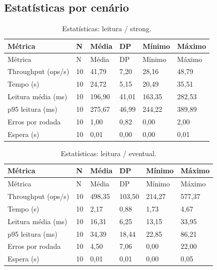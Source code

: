 \subsection{Estatísticas por cenário}
\begingroup\small\setlength{\tabcolsep}{4pt}
\begin{longtable}{llllll}
\caption{Estatísticas: leitura / strong.}\\
\toprule
Métrica & N & Média & DP & Mínimo & Máximo\\\midrule\endfirsthead
\toprule
Métrica & N & Média & DP & Mínimo & Máximo\\\midrule\endhead
\bottomrule\endfoot
Throughput (ops/s) & 10 & 41,79 & 7,20 & 28,16 & 48,79\\
Tempo (s) & 10 & 24,72 & 5,15 & 20,49 & 35,51\\
Leitura média (ms) & 10 & 196,90 & 41,01 & 163,35 & 282,53\\
p95 leitura (ms) & 10 & 275,67 & 46,99 & 244,22 & 389,89\\
Erros por rodada & 10 & 1,00 & 0,82 & 0,00 & 2,00\\
Espera (s) & 10 & 0,01 & 0,00 & 0,00 & 0,01\\
\end{longtable}
\endgroup

\begingroup\small\setlength{\tabcolsep}{4pt}
\begin{longtable}{llllll}
\caption{Estatísticas: leitura / eventual.}\\
\toprule
Métrica & N & Média & DP & Mínimo & Máximo\\\midrule\endfirsthead
\toprule
Métrica & N & Média & DP & Mínimo & Máximo\\\midrule\endhead
\bottomrule\endfoot
Throughput (ops/s) & 10 & 498,35 & 103,50 & 214,27 & 577,37\\
Tempo (s) & 10 & 2,17 & 0,88 & 1,73 & 4,67\\
Leitura média (ms) & 10 & 16,31 & 6,25 & 13,15 & 33,95\\
p95 leitura (ms) & 10 & 34,39 & 18,44 & 22,85 & 86,21\\
Erros por rodada & 10 & 4,50 & 7,06 & 0,00 & 22,00\\
Espera (s) & 10 & 0,01 & 0,01 & 0,00 & 0,05\\
\end{longtable}
\endgroup

